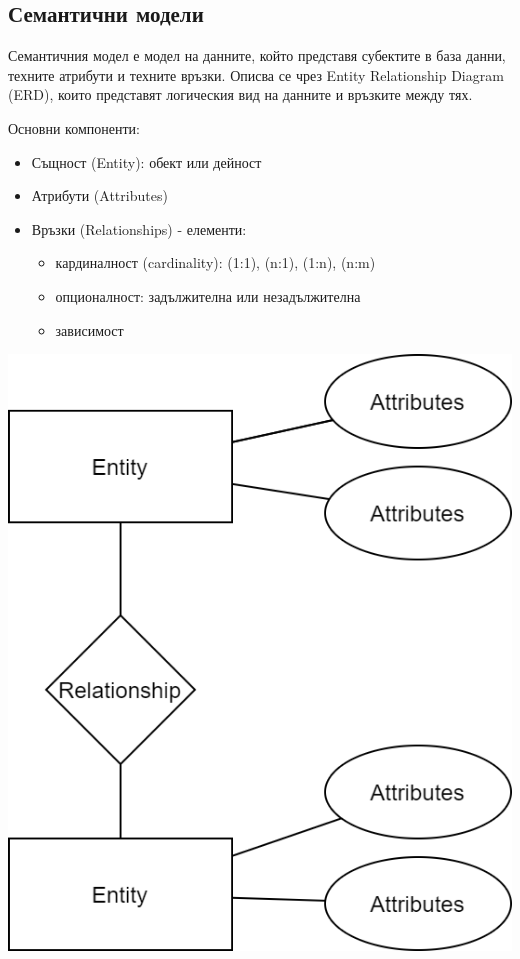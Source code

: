 \documentclass[fleqn,12pt]{article}
\begin{document}
\subsection{Семантични модели}
Семантичния модел е модел на данните, който представя субектите в база данни, техните атрибути и техните връзки. Описва се чрез Entity Relationship Diagram (ERD), които представят логическия вид на данните и връзките между тях.
\begin{multicols}{2}

Основни компоненти:
\begin{itemize}
	\item Същност (Entity): обект или дейност
	\item Атрибути (Attributes)
	\item Връзки (Relationships) - елементи:
	\begin{itemize}
		\item кардиналност (cardinality): (1:1), (n:1), (1:n), (n:m)
		\item опционалност: задължителна или незадължителна
		\item зависимост
	\end{itemize}
\end{itemize}

\includegraphics[scale=.33]{ERD}

\end{multicols}
\end{document}

